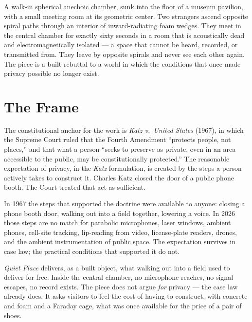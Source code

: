 \documentclass[]{anvil-installation}
\begin{document}
\maketitleblock
\herofigure{}

\begin{callout}[title=Premise]
A walk-in spherical anechoic chamber, sunk into the floor of a museum pavilion, with a small meeting room at its geometric center. Two strangers ascend opposite spiral paths through an interior of inward-radiating foam wedges. They meet in the central chamber for exactly sixty seconds in a room that is acoustically dead and electromagnetically isolated --- a space that cannot be heard, recorded, or transmitted from. They leave by opposite spirals and never see each other again. The piece is a built rebuttal to a world in which the conditions that once made privacy possible no longer exist.
\end{callout}

\section{The Frame}

The constitutional anchor for the work is \textit{Katz v.\ United States} (1967), in which the Supreme Court ruled that the Fourth Amendment ``protects people, not places,'' and that what a person ``seeks to preserve as private, even in an area accessible to the public, may be constitutionally protected.'' The reasonable expectation of privacy, in the \textit{Katz} formulation, is created by the steps a person actively takes to construct it. Charles Katz closed the door of a public phone booth. The Court treated that act as sufficient.

In 1967 the steps that supported the doctrine were available to anyone: closing a phone booth door, walking out into a field together, lowering a voice. In 2026 those steps are no match for parabolic microphones, laser windows, ambient phones, cell-site tracking, lip-reading from video, license-plate readers, drones, and the ambient instrumentation of public space. The expectation survives in case law; the practical conditions that supported it do not.

\textit{Quiet Place} delivers, as a built object, what walking out into a field used to deliver for free. Inside the central chamber, no microphone reaches, no signal escapes, no record exists. The piece does not argue \textit{for} privacy --- the case law already does. It asks visitors to feel the cost of having to construct, with concrete and foam and a Faraday cage, what was once available for the price of a pair of shoes.
\end{document}
